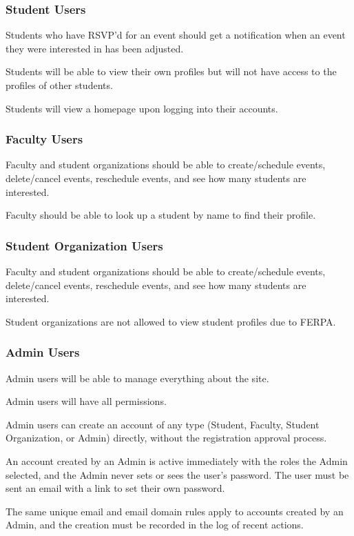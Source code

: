 		\subsubsection{Student Users}
			\begin{subenumerate}[leftmargin=3\parindent]
				\item Students who have RSVP’d for an event should get a notification when an event they were interested in has been adjusted.
				\item Students will be able to view their own profiles but will not have access to the profiles of other students.
				\item Students will view a homepage upon logging into their accounts.
			\end{subenumerate}
		\subsubsection{Faculty Users}
			\begin{subenumerate}[leftmargin=3\parindent]
				\item Faculty and student organizations should be able to create/schedule events, delete/cancel events, reschedule events, and see how many students are interested. 
				\item Faculty should be able to look up a student by name to find their profile.
			\end{subenumerate}
		\subsubsection{Student Organization Users}
			\begin{subenumerate}[leftmargin=3\parindent]
				\item Faculty and student organizations should be able to create/schedule events, delete/cancel events, reschedule events, and see how many students are interested.
				\item Student organizations are not allowed to view student profiles due to FERPA.
			\end{subenumerate}
		\subsubsection{Admin Users}
			\begin{subenumerate}[leftmargin=3\parindent]
				\item Admin users will be able to manage everything about the site.
				\item Admin users will have all permissions.
				\item Admin users can create an account of any type (Student, Faculty, Student Organization, or Admin) directly, without the registration approval process.
				\item An account created by an Admin is active immediately with the roles the Admin selected, and the Admin never sets or sees the user's password. The user must be sent an email with a link to set their own password.
				\item The same unique email and email domain rules apply to accounts created by an Admin, and the creation must be recorded in the log of recent actions.
			\end{subenumerate}
